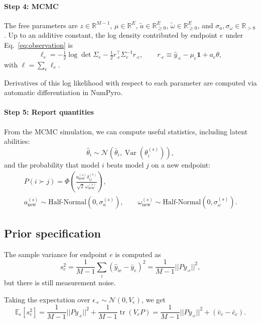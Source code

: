 \documentclass{article}
\DeclareMathOperator{\tr}{tr}
\DeclareMathOperator{\Var}{Var}
\begin{document}
\paragraph{Step 4: MCMC}
The free parameters are $z \in \mathbb{R}^{M-1}$,
$\mu \in \mathbb{R}^{E}$, $\tilde{a} \in \mathbb{R}^{E}_{\geq 0}$,
$\tilde{\omega} \in \mathbb{R}^{E}_{\geq 0}$, and
$\sigma_a, \sigma_\omega \in \mathbb{R}_{>0}$. Up to an additive constant, the
log density contributed by endpoint $e$ under Eq.~\ref{eq:observation} is
\begin{equation}
  \ell_e = -\tfrac{1}{2}\log\det\Sigma_e - \tfrac{1}{2} r_{\cdot e}^\top \Sigma_e^{-1} r_{\cdot e},
  \qquad
  r_{\cdot e} \equiv \hat{y}_{\cdot e} - \mu_e\mathbf{1} + a_e\theta,
\end{equation}
with $\ell = \sum_e \ell_e$.

Derivatives of this log likelihood with respect to each parameter are computed via automatic differentiation in NumPyro.

\paragraph{Step 5: Report quantities}
From the MCMC simulation, we can compute useful statistics, including latent abilities:
\begin{equation}
    \hat{\theta}_i \sim \mathcal{N}(\bar{\theta}_i, \Var(\theta_i^{(s)})),
\end{equation}
and the probability that model $i$ beats model $j$ on a new endpoint:
\begin{gather}
    P(i \succ j) = \Phi\!\left(\frac{a_{\text{new}}^{(s)}\delta_{ij}^{(s)}}{\sqrt{2}\,\omega_{\text{new}}^{(s)}}\right), \\
    a_{\text{new}}^{(s)} \sim \text{Half-Normal}(0, \sigma_a^{(s)}), \qquad
    \omega_{\text{new}}^{(s)} \sim \text{Half-Normal}(0, \sigma_\omega^{(s)}).
\end{gather}

\subsection{Prior specification}
The sample variance for endpoint $e$ is computed as
\begin{equation}
    s_e^2 = \frac{1}{M-1}\sum_i (\hat{y}_{ie} - \bar{y}_e)^2 = \frac{1}{M-1}||P\hat{y}_{\cdot e}||^2,
\end{equation} but there is still measurement noise.

Taking the expectation over $\epsilon_{\cdot e} \sim \mathcal{N}(0, V_e)$, we get
\begin{equation}
    \mathbb{E}_{\epsilon}[s_e^2] = \frac{1}{M-1}||Py_{\cdot e}||^2 + \frac{1}{M-1}\tr(V_eP) = \frac{1}{M-1}||Py_{\cdot e}||^2 + (\bar{v}_e - \bar{c}_e).
\end{equation}
\end{document}
